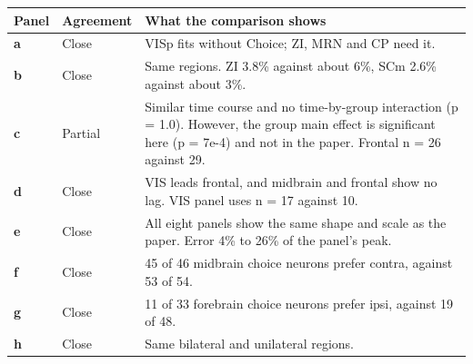 \begin{longtable}{@{}p{1.1cm}p{2.5cm}p{11.8cm}@{}}
\toprule
Panel & Agreement & What the comparison shows \\
\midrule
\endhead
\textbf{a} & Close & VISp fits without Choice; ZI, MRN and CP need it. \\
\textbf{b} & Close & Same regions. ZI 3.8\% against about 6\%, SCm 2.6\% against about 3\%. \\
\textbf{c} & Partial & Similar time course and no time-by-group interaction (p = 1.0). However, the group main effect is significant here (p = 7e-4) and not in the paper. Frontal n = 26 against 29. \\
\textbf{d} & Close & VIS leads frontal, and midbrain and frontal show no lag. VIS panel uses n = 17 against 10. \\
\textbf{e} & Close & All eight panels show the same shape and scale as the paper. Error 4\% to 26\% of the panel's peak. \\
\textbf{f} & Close & 45 of 46 midbrain choice neurons prefer contra, against 53 of 54. \\
\textbf{g} & Close & 11 of 33 forebrain choice neurons prefer ipsi, against 19 of 48. \\
\textbf{h} & Close & Same bilateral and unilateral regions. \\
\bottomrule
\end{longtable}
